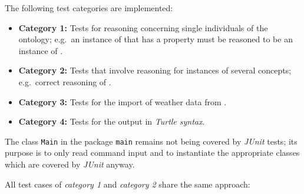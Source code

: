 The following test categories are implemented:
\begin{itemize}
  \item \textbf{Category 1:} Tests for  reasoning concerning single individuals of the ontology; e.g.\ an instance of  that has a  property must be reasoned to be an instance of .
  \item \textbf{Category 2:} Tests that involve reasoning for instances of several concepts; e.g.\ correct reasoning of .
  \item \textbf{Category 3:} Tests for the import of weather data from \yrno.
  \item \textbf{Category 4:} Tests for the output in \emph{\acs{Turtle} syntax}.
\end{itemize}

The class \texttt{Main} in the package \texttt{main} remains not being covered by \emph{JUnit} tests; its purpose is to only read command input and to instantiate the appropriate classes which are covered by \emph{JUnit} anyway.

All test cases of \emph{category 1} and \emph{category 2} share the same approach:

